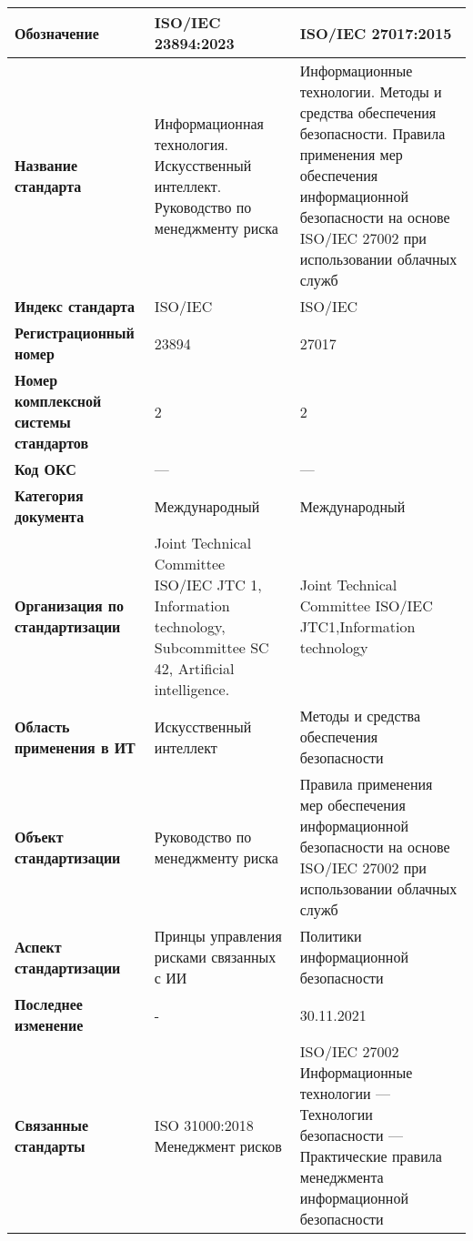 \begin{table}[h!tp]
	\small
	\centering
	\caption{}
	\label{table:international}
	\begin{tabular}{|p{10em}|p{14em}|p{14em}|}
		\hline
		\textbf{Обозначение}
			& \textbf{ISO/IEC 23894:2023} & \textbf{ISO/IEC 27017:2015} \\ \hline
		\textbf{Название стандарта}
				& Информационная технология. Искусственный интеллект. Руководство по менеджменту риска
				& Информационные технологии. Методы и средства обеспечения безопасности. Правила применения мер обеспечения информационной безопасности на основе ISO/IEC 27002 при использовании облачных служб \\ \hline
		\textbf{Индекс стандарта}
			& ISO/IEC & ISO/IEC \\ \hline
		\textbf{Регистрационный номер}
			& 23894 & 27017 \\ \hline
		\textbf{Номер комплексной системы стандартов}
			& 2 & 2 \\ \hline
		\textbf{Код ОКС}
			& --- & --- \\ \hline
		\textbf{Категория документа}
			& Международный
			& Международный \\ \hline
		\textbf{Организация по стандартизации}
			& Joint Technical Committee ISO/IEC JTC 1, Information technology, Subcommittee SC 42, Artificial intelligence.
			& Joint Technical Committee ISO/IEC JTC1,Information technology \\ \hline
		\textbf{Область применения в ИТ}
			& Искусственный интеллект
			& Методы и средства обеспечения безопасности \\ \hline
		\textbf{Объект стандартизации}
			& Руководство по менеджменту риска
			&  Правила применения мер обеспечения информационной безопасности на основе ISO/IEC 27002 при использовании облачных служб \\ \hline
		\textbf{Аспект стандартизации}
			& Принцы управления рисками связанных с  ИИ
			& Политики информационной безопасности \\ \hline
		\textbf{Последнее изменение} & - & 30.11.2021 \\ \hline
		\textbf{Связанные стандарты} & ISO 31000:2018 Менеджмент рисков & ISO/IEC 27002 Информационные технологии — Технологии безопасности — Практические правила менеджмента информационной безопасности \\ \hline
	\end{tabular}
\end{table}

